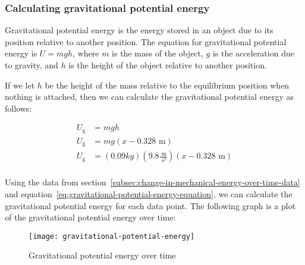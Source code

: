 \documentclass{article}
\begin{document}
            \subsubsection{Calculating gravitational potential energy}
                Gravitational potential energy is the energy stored in an object due to its position relative to another position.
                The equation for gravitational potential energy is $U = mgh$, where $m$ is the mass of the object, $g$ is the acceleration due to gravity, and $h$ is the height of the object relative to another position.
                
                If we let $h$ be the height of the mass relative to the equilibrium position when nothing is attached, then we can calculate the gravitational potential energy as follows:
                
                \begin{equation}
                    \begin{aligned}
                        U_{\text{g}} &= mgh \\
                        U_{\text{g}} &= mg(x - 0.328 \text{ m}) \\
                        U_{\text{g}} &= (0.09 kg)(9.8 \frac{\text{ m}}{\text{ s}^2})(x - 0.328 \text{ m}) \\
                    \end{aligned}\label{eq:gravitational-potential-energy-equation}
                \end{equation}
                
                Using the data from section~\ref{subsec:change-in-mechanical-energy-over-time-data} and equation~\ref{eq:gravitational-potential-energy-equation}, we can calculate the gravitational potential energy for each data point.
                The following graph is a plot of the gravitational potential energy over time:
                
                \begin{figure}[H]
                    \centering
                    \texttt{[image: gravitational-potential-energy]}
                    \caption{Gravitational potential energy over time}
                    \label{fig:gravitational-potential-energy}
                \end{figure}
                
\end{document}
